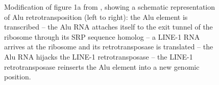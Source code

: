 \begin{figure}[b!]
\centering
\caption{Modification of figure 1a from \citet{Baar2022}, showing a schematic
  representation of Alu retrotransposition (left to right): the Alu element
  is transcribed -- the Alu RNA attaches itself to the exit tunnel of the
  ribosome through its SRP sequence homolog -- a LINE-1 RNA arrives at the
  ribosome and its retrotransposase is translated -- the Alu RNA hijacks the
  LINE-1 retrotransposase -- the LINE-1 retrotransposase reinserts the Alu
  element into a new genomic position.}
\label{fig:alulife}
\end{figure}

